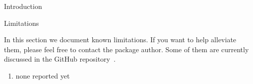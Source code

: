 \begin{sfragment}[id=sec:intro]{Introduction}
\begin{sfragment}[id=sec:limitations]{Limitations}

In this section we document known limitations. If you want to help alleviate them,
please feel free to contact the package author. Some of them are currently discussed in
the \sTeX GitHub repository~\cite{sTeX:github:on}. 
\begin{enumerate}
\item none reported yet
\end{enumerate}
\end{sfragment}
\end{sfragment}

